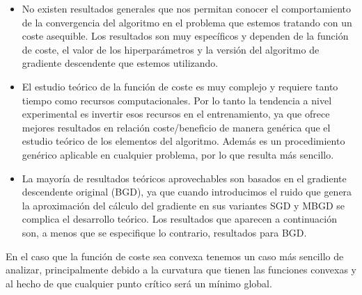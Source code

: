 \begin{itemize}

    \item No existen resultados generales que nos permitan conocer el comportamiento de la convergencia del algoritmo en el problema que estemos tratando con un coste asequible. Los resultados son muy específicos y dependen de la función de coste, el valor de los hiperparámetros y la versión del algoritmo de gradiente descendente que estemos utilizando.

    \item El estudio teórico de la función de coste es muy complejo y requiere tanto tiempo como recursos computacionales. Por lo tanto la tendencia a nivel experimental es invertir esos recursos en el entrenamiento, ya que ofrece mejores resultados en relación coste/beneficio de manera genérica que el estudio teórico de los elementos del algoritmo. Además es un procedimiento genérico aplicable en cualquier problema, por lo que resulta más sencillo.

    \item La mayoría de resultados teóricos aprovechables son basados en el gradiente descendente original (BGD), ya que cuando introducimos el ruido que genera la aproximación del cálculo del gradiente en sus variantes SGD y MBGD se complica el desarrollo teórico. Los resultados que aparecen a continuación son, a menos que se especifique lo contrario, resultados para BGD.
   
\end{itemize}


En el caso que la función de coste sea convexa tenemos un caso más sencillo de analizar, principalmente debido a la curvatura que tienen las funciones convexas y al hecho de que cualquier punto crítico será un mínimo global.

